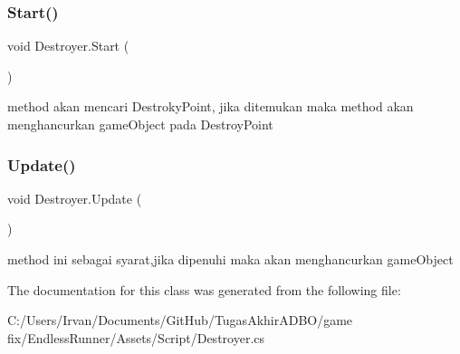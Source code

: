 \subsubsection{\texorpdfstring{Start()}{Start()}}
{\footnotesize\ttfamily void Destroyer.\+Start (\begin{DoxyParamCaption}{ }\end{DoxyParamCaption})\hspace{0.3cm}{\ttfamily [private]}}



method akan mencari Destroky\+Point, jika ditemukan maka method akan menghancurkan game\+Object pada Destroy\+Point 

\hypertarget{class_destroyer_a50232aedbebf94ee992ccb30d891bf64}{}\label{class_destroyer_a50232aedbebf94ee992ccb30d891bf64} 
\subsubsection{\texorpdfstring{Update()}{Update()}}
{\footnotesize\ttfamily void Destroyer.\+Update (\begin{DoxyParamCaption}{ }\end{DoxyParamCaption})\hspace{0.3cm}{\ttfamily [private]}}



method ini sebagai syarat,jika dipenuhi maka akan menghancurkan game\+Object 



The documentation for this class was generated from the following file\+:\begin{DoxyCompactItemize}
\item 
C\+:/\+Users/\+Irvan/\+Documents/\+Git\+Hub/\+Tugas\+Akhir\+A\+D\+B\+O/game fix/\+Endless\+Runner/\+Assets/\+Script/Destroyer.\+cs\end{DoxyCompactItemize}
